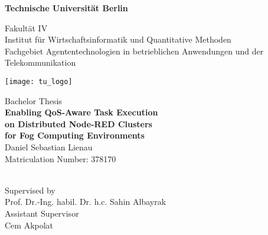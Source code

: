 \thispagestyle{empty}
\begin{center}

{\LARGE \textbf{Technische Universität Berlin}}

\vspace{0.5cm}

{\large Fakultät IV\\[1mm]}
{\large Institut für Wirtschaftsinformatik und Quantitative Methoden\\[1mm]}
{\large Fachgebiet Agententechnologien in betrieblichen Anwendungen und der Telekommunikation\\[5mm]}

\vspace*{1cm}

\texttt{[image: tu\_logo]}

\vspace*{1.0cm}

{\LARGE Bachelor Thesis}\\

\vspace{1.0cm}
{\LARGE \textbf{Enabling QoS-­Aware Task Execution}}\\
\vspace*{0.3cm}
{\LARGE \textbf{on Distributed Node­-RED Clusters}}\\
\vspace*{0.3cm}
{\LARGE \textbf{for Fog Computing Environments}}\\
\vspace*{1.0cm}
{\LARGE Daniel Sebastian Lienau}
\\
\vspace*{0.5cm}
Matriculation Number: 378170\\
\todayGerman\\ %
\vspace*{1.0cm}

Supervised by\\
Prof. Dr.-Ing. habil. Dr. h.c. Sahin Albayrak\\
\vspace*{0.5cm}
Assistant Supervisor\\
Cem Akpolat


\end{center}
